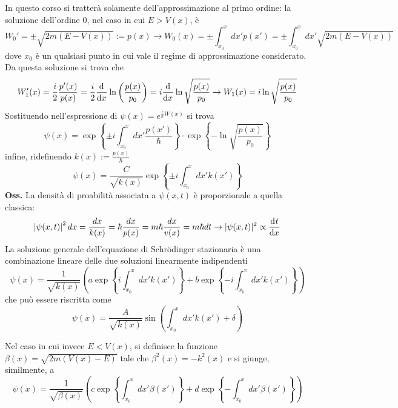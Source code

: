 In questo corso si tratterà solamente dell'approssimazione al primo ordine: la soluzione dell'ordine
0, nel caso in cui $E>V(x)$, è
$$W_0'=\pm\sqrt{2m(E-V(x))}:=p(x)\rightarrow W_0(x)=\pm\int_{x_0}^{x}dx'p(x') =
\pm\int_{x_0}^{x}dx'\sqrt{2m(E-V(x))}$$
dove $x_0$ è un qualsiasi punto in cui vale il regime di approssimazione considerato.\\
Da questa soluzione si trova che
$$W_1'(x) = \frac{i}{2}\frac{p'(x)}{p(x)} = \frac{i}{2}\dv[]{}{x}\ln\left(\frac{p(x)}{p_0}\right) = 
i\dv[]{}{x}\ln\sqrt{\frac{p(x)}{p_0}}\rightarrow W_1(x)=i\ln\sqrt{\frac{p(x)}{p_0}}$$
Sostituendo nell'espressione di $\psi(x)=e^{\frac{i}{\hbar}W(x)}$ si trova
$$\psi(x) = \exp\left\{\pm i\int_{x_0}^{x}dx'\frac{p(x')}{\hbar}\right\}\cdot
\exp\left\{-\ln\sqrt{\frac{p(x)}{p_0}}\right\}$$
infine, ridefinendo $k(x):=\frac{p(x)}{\hbar}$
$$\psi(x) = \frac{C}{\sqrt{k(x)}}\exp\left\{\pm i\int_{x_0}^{x}dx'k(x')\right\}$$
\textbf{Oss.} La densità di proabilità associata a $\psi(x,t)$ è proporzionale a quella classica:
$$\left|\psi(x,t)\right|^2dx=\frac{dx}{k(x)} = \hbar\frac{dx}{p(x)}=m\hbar\frac{dx}{v(x)}=
m\hbar dt\rightarrow|\psi(x,t)|^2\propto \dv[]{t}{x}$$
La soluzione generale dell'equazione di Schrödinger stazionaria è una combinazione lineare delle due
soluzioni linearmente indipendenti
\begin{equation}
\boxed{\psi(x)=\frac{1}{\sqrt{k(x)}}\left(a\exp\left\{i\int_{x_0}^{x}dx'k(x')\right\}+b
\exp\left\{-i\int_{x_0}^{x}dx'k(x')\right\}\right)}
\label{eq:wkb_free_exp}
\end{equation}
che può essere riscritta come
\begin{equation}
    \boxed{\psi(x)=\frac{A}{\sqrt{k(x)}} \sin\left(\int_{x_0}^{x}dx'k(x')+\delta\right)}
\label{eq:wkb_free_sin}
\end{equation}

Nel caso in cui invece $E<V(x)$, si definisce la funzione $\beta(x) = \sqrt{2m(V(x)-E)}$ tale che
$\beta^2(x)=-k^2(x)$ e si giunge, similmente, a
\begin{equation}
    \boxed{\psi(x) = \frac{1}{\sqrt{\beta(x)}}\left(c\exp\left\{\int_{x_0}^{x}dx'\beta(x')\right\} +
    d\exp\left\{-\int_{x_0}^{x}dx'\beta(x')\right\}\right)}
    \label{eq:wkb_constr}
\end{equation}

